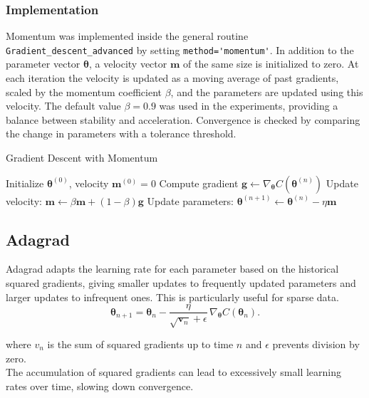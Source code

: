 \documentclass[
    article
 reprint,            %
 amsmath,amssymb,
 aps,
]{revtex4-2}
\begin{document}
\subsubsection{Implementation}

Momentum was implemented inside the general routine \verb|Gradient_descent_advanced| by setting \verb|method='momentum'|. In addition to the parameter vector $\boldsymbol{\theta}$, a velocity vector $\mathbf{m}$ of the same size is initialized to zero. At each iteration the velocity is updated as a moving average of past gradients, scaled by the momentum coefficient $\beta$, and the parameters are updated using this velocity.
The default value $\beta=0.9$ was used in the experiments, providing a balance between stability and acceleration. Convergence is checked by comparing the change in parameters with a tolerance threshold.
\begin{algorithm}[H]
\caption{Gradient Descent with Momentum}
\begin{algorithmic}[1]
\State Initialize $\boldsymbol{\theta}^{(0)}$, velocity $\mathbf{m}^{(0)}=0$
\State Compute gradient $\mathbf{g} \gets \nabla_{\boldsymbol{\theta}} C(\boldsymbol{\theta}^{(n)})$
\State Update velocity: $\mathbf{m} \gets \beta \mathbf{m} + (1-\beta)\mathbf{g}$
\State Update parameters: $\boldsymbol{\theta}^{(n+1)} \gets \boldsymbol{\theta}^{(n)} - \eta \mathbf{m}$
\EndFor
\end{algorithmic}
\end{algorithm}

\subsection{Adagrad}

Adagrad adapts the learning rate for each parameter based on the historical squared gradients, giving smaller updates to frequently updated parameters and larger updates to infrequent ones\cite{hjorthjensen_week37}.
This is particularly useful for sparse data.  
\[
\boldsymbol{\theta}_{n+1} = \boldsymbol{\theta}_n - \frac{\eta}{\sqrt{\boldsymbol{v}_n} + \epsilon} \, \nabla_{\boldsymbol{\theta}} C(\boldsymbol{\theta}_n).
\]

where \(v_n\) is the sum of squared gradients up to time \(n\) and \(\epsilon\) prevents division by zero.  \\

The accumulation of squared gradients can lead to excessively small learning rates over time, slowing down convergence. \cite{goodfellow2016}
\end{document}
